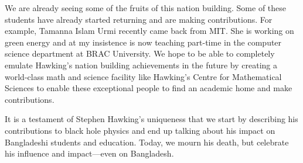 \documentclass[a4paper,11pt]{article}
\begin{document}
We are already seeing some of the fruits of this nation building. Some of these students have already started returning and are making contributions. For example, Tamanna Islam Urmi recently came back from MIT. She is working on green energy and at my insistence is now teaching part-time in the computer science department at BRAC University. We hope to be able to completely emulate Hawking's nation building achievements in the future by creating a world-class math and science facility like Hawking's Centre for Mathematical Sciences to enable these exceptional people to find an academic home and make contributions.

It is a testament of Stephen Hawking's uniqueness that we start by describing his contributions to black hole physics and end up talking about his impact on Bangladeshi students and education. Today, we mourn his death, but celebrate his influence and impact—even on Bangladesh.
\end{document}

